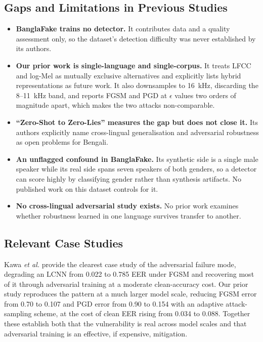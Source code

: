 \documentclass[conference]{IEEEtran}
\begin{document}
\subsection{Gaps and Limitations in Previous Studies}
\begin{itemize}
\item \textbf{BanglaFake \cite{fahad2025banglafake} trains no detector.} It
      contributes data and a quality assessment only, so the dataset's
      detection difficulty was never established by its authors.
\item \textbf{Our prior work \cite{ahmed2026melspec} is single-language and
      single-corpus.} It treats LFCC and log-Mel as mutually exclusive
      alternatives and explicitly lists hybrid representations as future work.
      It also downsamples to 16~kHz, discarding the 8--11~kHz band, and
      reports FGSM and PGD at $\epsilon$ values two orders of magnitude apart,
      which makes the two attacks non-comparable.
\item \textbf{``Zero-Shot to Zero-Lies'' \cite{samu2025zeroshot} measures the
      gap but does not close it.} Its authors explicitly name cross-lingual
      generalisation and adversarial robustness as open problems for Bengali.
\item \textbf{An unflagged confound in BanglaFake.} Its synthetic side is a
      single male speaker while its real side spans seven speakers of both
      genders, so a detector can score highly by classifying gender rather
      than synthesis artifacts. No published work on this dataset controls
      for it.
\item \textbf{No cross-lingual adversarial study exists.} No prior work
      examines whether robustness learned in one language survives transfer
      to another.
\end{itemize}

\subsection{Relevant Case Studies}
Kawa \emph{et al.} \cite{kawa2023lcnn} provide the clearest case study of the
adversarial failure mode, degrading an LCNN from 0.022 to 0.785 EER under FGSM
and recovering most of it through adversarial training at a moderate
clean-accuracy cost. Our prior study \cite{ahmed2026melspec} reproduces the
pattern at a much larger model scale, reducing FGSM error from 0.70 to 0.107
and PGD error from 0.90 to 0.154 with an adaptive attack-sampling scheme,
at the cost of clean EER rising from 0.034 to 0.088. Together these establish
both that the vulnerability is real across model scales and that adversarial
training is an effective, if expensive, mitigation.
\end{document}
